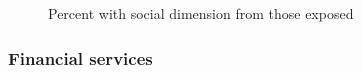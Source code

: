 \documentclass[
  letterpaper,
  DIV=11,
  numbers=noendperiod]{scrartcl}
\begin{document}
\begin{figure}[H]


\caption{\label{fig-ssp}Percent with social dimension from those
exposed}

\end{figure}%

\subsubsection{Financial services}\label{financial-services-1}
\end{document}
